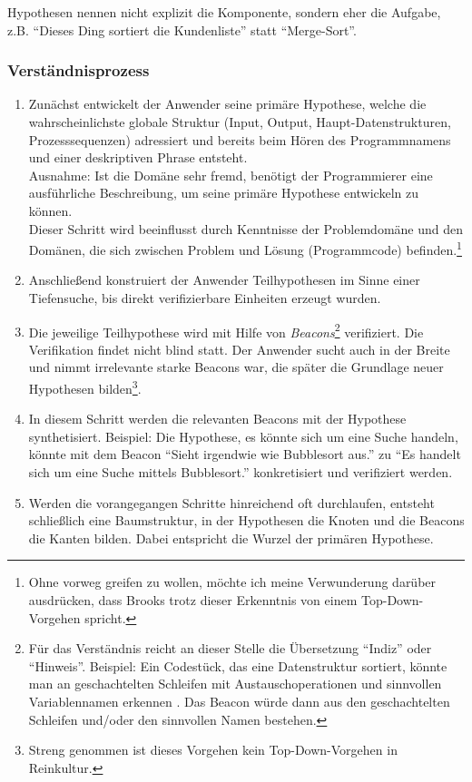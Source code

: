 Hypothesen nennen nicht explizit die Komponente, sondern eher die Aufgabe, z.B. ``Dieses Ding sortiert die Kundenliste'' statt ``Merge-Sort''.

\subsubsection{Verständnisprozess}
\begin{enumerate}
\item Zunächst entwickelt der Anwender seine primäre Hypothese, welche die wahrscheinlichste globale Struktur (Input, Output, Haupt-Datenstrukturen, Prozesssequenzen) adressiert und bereits beim Hören des Programmnamens und einer deskriptiven Phrase entsteht.
    \\Ausnahme: Ist die Domäne sehr fremd, benötigt der Programmierer eine ausführliche Beschreibung, um seine primäre Hypothese entwickeln zu können.
    \\Dieser Schritt wird beeinflusst durch Kenntnisse der Problemdomäne und den Domänen, die sich zwischen Problem und Lösung (Programmcode) befinden.\footnote{Ohne vorweg greifen zu wollen, möchte ich meine Verwunderung darüber ausdrücken, dass Brooks trotz dieser Erkenntnis von einem Top-Down-Vorgehen spricht.} 
\item Anschließend konstruiert der Anwender Teilhypothesen im Sinne einer Tiefensuche, bis direkt verifizierbare Einheiten erzeugt wurden. 
\item Die jeweilige Teilhypothese wird mit Hilfe von \textit{Beacons}\footnote{Für das Verständnis reicht an dieser Stelle die Übersetzung ``Indiz'' oder ``Hinweis''. Beispiel: Ein Codestück, das eine Datenstruktur sortiert, könnte man an geschachtelten Schleifen mit Austauschoperationen und sinnvollen Variablennamen erkennen \citep{Gellenbeck:1991vn}. Das Beacon würde dann aus den geschachtelten Schleifen und/oder den sinnvollen Namen bestehen.} verifiziert. Die Verifikation findet nicht blind statt. Der Anwender sucht auch in der Breite und nimmt irrelevante starke Beacons war, die später die Grundlage neuer Hypothesen bilden\footnote{Streng genommen ist dieses Vorgehen kein Top-Down-Vorgehen in Reinkultur.}. 
\item In diesem Schritt werden die relevanten Beacons mit der Hypothese synthetisiert. Beispiel: Die Hypothese, es könnte sich um eine Suche handeln, könnte mit dem Beacon ``Sieht irgendwie wie Bubblesort aus.'' zu ``Es handelt sich um eine Suche mittels Bubblesort.'' konkretisiert und verifiziert werden.
\item Werden die vorangegangen Schritte hinreichend oft durchlaufen, entsteht schließlich eine Baumstruktur, in der Hypothesen die Knoten und die Beacons die Kanten bilden. Dabei entspricht die Wurzel der primären Hypothese.
\end{enumerate}

